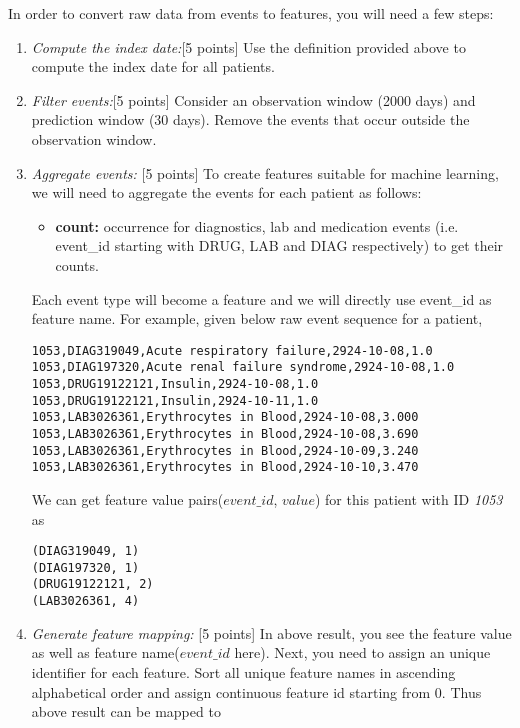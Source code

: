 \documentclass[12pt]{article}
\begin{document}
In order to convert raw data from events to features, you will need a few steps:
\begin{enumerate}
\item \emph{Compute the index date:}[5 points] Use the definition provided above to compute the index date for all patients. 

\item \emph{Filter events:}[5 points] Consider an observation window (2000 days) and prediction window (30 days).
Remove the events that occur outside the observation window. 

\item \emph{Aggregate events:} [5 points] To create features suitable for machine learning, we will need to aggregate the events for each patient as follows:
  \begin{itemize}
  \item \textbf{count:} occurrence for diagnostics, lab and medication events (i.e. event\_id starting with DRUG, LAB and DIAG respectively) to get their counts.  
  \end{itemize}
  
Each event type will become a feature and we will directly use event\_id as feature name. For example, given below raw event sequence for a patient, \\

\begin{lstlisting}[frame=single]
1053,DIAG319049,Acute respiratory failure,2924-10-08,1.0
1053,DIAG197320,Acute renal failure syndrome,2924-10-08,1.0
1053,DRUG19122121,Insulin,2924-10-08,1.0
1053,DRUG19122121,Insulin,2924-10-11,1.0
1053,LAB3026361,Erythrocytes in Blood,2924-10-08,3.000
1053,LAB3026361,Erythrocytes in Blood,2924-10-08,3.690
1053,LAB3026361,Erythrocytes in Blood,2924-10-09,3.240
1053,LAB3026361,Erythrocytes in Blood,2924-10-10,3.470
\end{lstlisting}

We can get feature value pairs($event\_id$, $value$) for this patient with ID \textit{1053} as \\
\begin{lstlisting}[frame=single]
(DIAG319049, 1)
(DIAG197320, 1)
(DRUG19122121, 2)
(LAB3026361, 4)
\end{lstlisting}


\item \emph{Generate feature mapping:} [5 points]
In above result, you see the feature value as well as feature name($event\_id$ here). Next, you need to assign an unique identifier for each feature. Sort all unique feature names in ascending alphabetical order and assign continuous feature id starting from 0. Thus above result can be mapped to


\end{enumerate}
\end{document}
